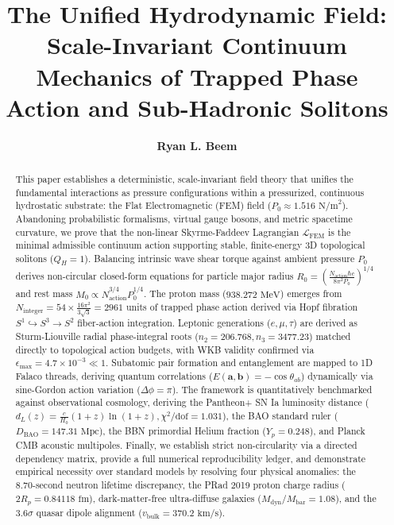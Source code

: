 \documentclass[11pt,a4paper]{article}
\title{\textbf{The Unified Hydrodynamic Field: Scale-Invariant Continuum Mechanics of Trapped Phase Action and Sub-Hadronic Solitons}}
\author{\textbf{Ryan L. Beem}}
\date{\pagestyle{empty}}
\begin{document}
	
	\maketitle
	
	\begin{abstract}
		This paper establishes a deterministic, scale-invariant field theory that unifies the fundamental interactions as pressure configurations within a pressurized, continuous hydrostatic substrate: the Flat Electromagnetic (FEM) field ($P_0 \approx 1.516\text{ N/m}^2$). Abandoning probabilistic formalisms, virtual gauge bosons, and metric spacetime curvature, we prove that the non-linear Skyrme-Faddeev Lagrangian $\mathcal{L}_{\text{FEM}}$ is the minimal admissible continuum action supporting stable, finite-energy 3D topological solitons ($Q_H = 1$). Balancing intrinsic wave shear torque against ambient pressure $P_0$ derives non-circular closed-form equations for particle major radius $R_0 = \left(\frac{N_{\text{action}} \hbar c}{8\pi^2 P_0}\right)^{1/4}$ and rest mass $M_0 \propto N_{\text{action}}^{3/4} P_0^{1/4}$. The proton mass ($938.272\text{ MeV}$) emerges from $N_{\text{integer}} = 54 \times \frac{16\pi^2}{3\sqrt{3}} = 2961$ units of trapped phase action derived via Hopf fibration $S^1 \hookrightarrow S^3 \to S^2$ fiber-action integration. Leptonic generations ($e,\mu,\tau$) are derived as Sturm-Liouville radial phase-integral roots ($n_2 = 206.768, n_3 = 3477.23$) matched directly to topological action budgets, with WKB validity confirmed via $\epsilon_{\text{max}} = 4.7 \times 10^{-3} \ll 1$. Subatomic pair formation and entanglement are mapped to 1D Falaco threads, deriving quantum correlations ($E(\mathbf{a},\mathbf{b}) = -\cos\theta_{ab}$) dynamically via sine-Gordon action variation ($\Delta\phi=\pi$). The framework is quantitatively benchmarked against observational cosmology, deriving the Pantheon+ SN Ia luminosity distance ($d_L(z) = \frac{c}{H_0}(1+z)\ln(1+z), \chi^2/\text{dof} = 1.031$), the BAO standard ruler ($D_{\text{BAO}} = 147.31\text{ Mpc}$), the BBN primordial Helium fraction ($Y_p = 0.248$), and Planck CMB acoustic multipoles. Finally, we establish strict non-circularity via a directed dependency matrix, provide a full numerical reproducibility ledger, and demonstrate empirical necessity over standard models by resolving four physical anomalies: the 8.70-second neutron lifetime discrepancy, the PRad 2019 proton charge radius ($2R_p = 0.84118\text{ fm}$), dark-matter-free ultra-diffuse galaxies ($M_{\text{dyn}}/M_{\text{bar}} = 1.08$), and the $3.6\sigma$ quasar dipole alignment ($v_{\text{bulk}} = 370.2\text{ km/s}$).
	\end{abstract}
	
\end{document}
